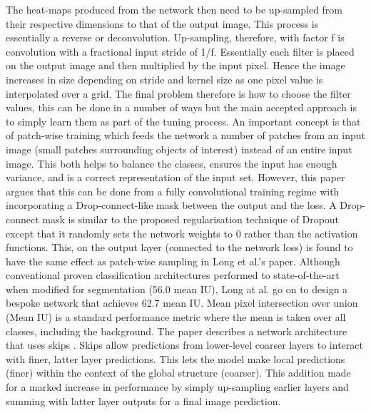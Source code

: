 \documentclass[11pt,twoside]{report}
\begin{document}
The heat-maps produced from the network then need to be up-sampled from their respective dimensions to that of the output image. This process is essentially a reverse or deconvolution. Up-sampling, therefore, with factor f is convolution with a fractional input stride of 1/f. Essentially each filter is placed on the output image and then multiplied by the input pixel. Hence the image increases in size depending on stride and kernel size as one pixel value is interpolated over a grid. The final problem therefore is how to choose the filter values, this can be done in a number of ways but the main accepted approach is to simply learn them as part of the tuning process.
\newline \newline
An important concept is that of patch-wise training which feeds the network a number of patches from an input image (small patches surrounding objects of interest) instead of an entire input image. This both helps to balance the classes, ensures the input has enough variance, and is a correct representation of the input set. However, this paper argues that this can be done from a fully convolutional training regime with incorporating a Drop-connect-like mask \cite{Wan:2013:RNN:3042817.3043055} between the output and the loss. A Drop-connect mask is similar to the proposed regularisation technique of Dropout \cite{JMLR:v15:srivastava14a} except that it randomly sets the network weights to 0 rather than the activation functions. This, on the output layer (connected to the network loss) is found to have the same effect as patch-wise sampling in Long et al.'s paper.
\newline \newline
Although conventional proven classification architectures performed to state-of-the-art when modified for segmentation (56.0 mean IU), Long at al. \cite{DBLP:journals/corr/LongSD14} go on to design a bespoke network that achieves 62.7 mean IU. Mean pixel intersection over union (Mean IU) is a standard performance metric where the mean is taken over all classes, including the background. The paper describes a network architecture that uses skips \cite{Bishop:2006:PRM:1162264}. Skips allow predictions from lower-level coarser layers to interact with finer, latter layer predictions. This lets the model make local predictions (finer) within the context of the global structure (coarser). This addition made for a marked increase in performance by simply up-sampling earlier layers and summing with latter layer outputs for a final image prediction.
\end{document}
